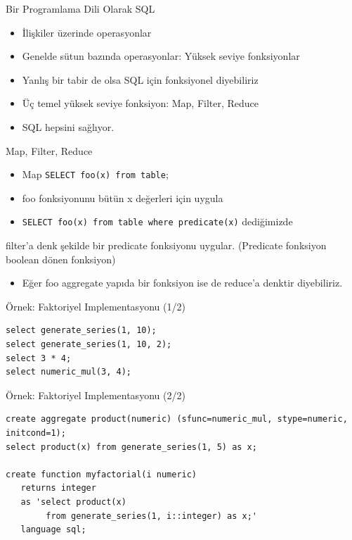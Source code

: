 \documentclass[presentation]{beamer}
\begin{document}
\begin{frame}[label=sec-4]{Bir Programlama Dili Olarak SQL}
\begin{itemize}
\item İlişkiler üzerinde operasyonlar
\item Genelde sütun bazında operasyonlar: Yüksek seviye fonksiyonlar
\item Yanlış bir tabir de olsa SQL için fonksiyonel diyebiliriz
\item Üç temel yüksek seviye fonksiyon: Map, Filter, Reduce
\item SQL hepsini sağlıyor.
\end{itemize}
\end{frame}

\begin{frame}[fragile,label=sec-5]{Map, Filter, Reduce}
 \begin{itemize}
\item Map \texttt{SELECT foo(x) from table};
\item foo fonksiyonunu bütün x değerleri için uygula
\item \texttt{SELECT foo(x) from table where predicate(x)} dediğimizde
\end{itemize}
filter'a denk şekilde bir predicate fonksiyonu uygular. (Predicate fonksiyon
boolean dönen fonksiyon)
\begin{itemize}
\item Eğer foo aggregate yapıda bir fonksiyon ise de reduce'a denktir diyebiliriz.
\end{itemize}
\end{frame}

\begin{frame}[fragile,label=sec-6]{Örnek: Faktoriyel Implementasyonu (1/2)}
 \begin{verbatim}
select generate_series(1, 10);
select generate_series(1, 10, 2);
select 3 * 4;
select numeric_mul(3, 4);
\end{verbatim}
\end{frame}

\begin{frame}[fragile,label=sec-7]{Örnek: Faktoriyel Implementasyonu (2/2)}
 \begin{verbatim}
create aggregate product(numeric) (sfunc=numeric_mul, stype=numeric, initcond=1);
select product(x) from generate_series(1, 5) as x;

create function myfactorial(i numeric)
   returns integer
   as 'select product(x)
        from generate_series(1, i::integer) as x;'
   language sql;
\end{verbatim}
\end{frame}
\end{document}

